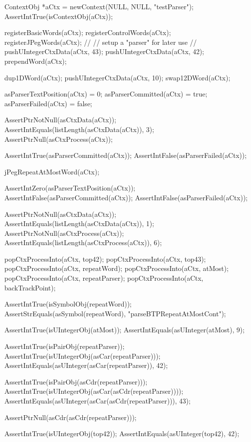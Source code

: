 \startCTest
  ContextObj *aCtx = newContext(NULL, NULL, "testParser");
  AssertIntTrue(isContextObj(aCtx));
  
  registerBasicWords(aCtx);
  registerControlWords(aCtx);
  registerJPegWords(aCtx);
  //
  // setup a "parser" for later use
  //
  pushUIntegerCtxData(aCtx, 43);
  pushUIntegerCtxData(aCtx, 42);
  prependWord(aCtx);
  
  dup1DWord(aCtx);
  pushUIntegerCtxData(aCtx, 10);
  swap12DWord(aCtx);
  
  asParserTextPosition(aCtx) = 0;
  asParserCommitted(aCtx)    = true;
  asParserFailed(aCtx)       = false;
  
  AssertPtrNotNull(asCtxData(aCtx));
  AssertIntEquals(listLength(asCtxData(aCtx)), 3);
  AssertPtrNull(asCtxProcess(aCtx));
  
  AssertIntTrue(asParserCommitted(aCtx));
  AssertIntFalse(asParserFailed(aCtx));
  
  jPegRepeatAtMostWord(aCtx);
  
  AssertIntZero(asParserTextPosition(aCtx));
  AssertIntFalse(asParserCommitted(aCtx));
  AssertIntFalse(asParserFailed(aCtx));
  
  AssertPtrNotNull(asCtxData(aCtx));
  AssertIntEquals(listLength(asCtxData(aCtx)), 1);
  AssertPtrNotNull(asCtxProcess(aCtx));
  AssertIntEquals(listLength(asCtxProcess(aCtx)), 6);
    
  popCtxProcessInto(aCtx, top42);
  popCtxProcessInto(aCtx, top43);
  popCtxProcessInto(aCtx, repeatWord);
  popCtxProcessInto(aCtx, atMost);
  popCtxProcessInto(aCtx, repeatParser);
  popCtxProcessInto(aCtx, backTrackPoint);
  
  AssertIntTrue(isSymbolObj(repeatWord));
  AssertStrEquals(asSymbol(repeatWord), "parseBTPRepeatAtMostCont");
  
  AssertIntTrue(isUIntegerObj(atMost));
  AssertIntEquals(asUInteger(atMost), 9);
  
  AssertIntTrue(isPairObj(repeatParser));
  AssertIntTrue(isUIntegerObj(asCar(repeatParser)));
  AssertIntEquals(asUInteger(asCar(repeatParser)), 42);
  
  AssertIntTrue(isPairObj(asCdr(repeatParser)));
  AssertIntTrue(isUIntegerObj(asCar(asCdr(repeatParser))));
  AssertIntEquals(asUInteger(asCar(asCdr(repeatParser))), 43);
  
  AssertPtrNull(asCdr(asCdr(repeatParser)));
  
  AssertIntTrue(isUIntegerObj(top42));
  AssertIntEquals(asUInteger(top42), 42);  

